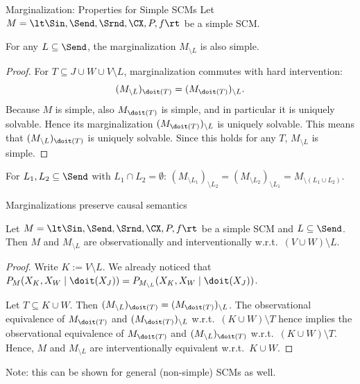 \begin{frame}{Marginalization: Properties for Simple  SCMs}
Let $M = \lt \Sin, \Send, \Srnd, \CX, P, f \rt$ be a simple SCM.
\begin{Prp}
  For any $L \subseteq \Send$, the marginalization $M_{\setminus L}$ is also simple.
\end{Prp}
\begin{proof}
  For $T \subseteq J \cup W \cup V \setminus L$, marginalization commutes with hard intervention:
  $$(M_{\setminus L})_{\doit(T)} = (M_{\doit(T)})_{\setminus L}.$$
  Because $M$ is simple, also $M_{\doit(T)}$ is simple, and in particular it is
  uniquely solvable. 
  Hence its marginalization $(M_{\doit(T)})_{\setminus L}$ is uniquely solvable.
  This means that $(M_{\setminus L})_{\doit(T)}$ is uniquely solvable. Since this
  holds for any $T$, $M_{\setminus L}$ is simple.
\end{proof}
\begin{Cor}
  For $L_1, L_2 \subseteq \Send$ with $L_1 \cap L_2 = \emptyset$:
    $(M_{\setminus L_1})_{\setminus L_2} = (M_{\setminus L_2})_{\setminus L_1} = M_{\setminus (L_1 \cup L_2)}$.
\end{Cor}
\end{frame}

\begin{frame}{Marginalizations preserve causal semantics}
\begin{Thm}
  Let $M = \lt \Sin, \Send, \Srnd, \CX, P, f \rt$ be a simple SCM and $L \subseteq \Send$.
  Then $M$ and $M_{\setminus L}$ are observationally and
  interventionally %
  w.r.t.\ $(V \cup W) \setminus L$.
\end{Thm}
\begin{proof}
  Write $K := V \setminus L$. We already noticed that
  $P_{M}(X_K,X_W \mid \doit(X_J)) = P_{M_{\setminus L}}(X_K,X_W \mid \doit(X_J))$.

  Let $T \subseteq K \cup W$. Then $(M_{\setminus L})_{\doit(T)} = (M_{\doit(T)})_{\setminus L}$.
  The observational equivalence of $M_{\doit(T)}$ and $(M_{\doit(T)})_{\setminus L}$ w.r.t.\ $(K \cup W) \setminus T$ hence implies the observational equivalence of $M_{\doit(T)}$ and $(M_{\setminus L})_{\doit(T)}$ w.r.t.\ $(K \cup W) \setminus T$.
  Hence, $M$ and $M_{\setminus L}$ are interventionally equivalent w.r.t.\ $K \cup W$.
\end{proof}
Note: this can be shown for general (non-simple) SCMs as well.
\end{frame}

